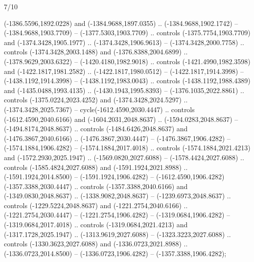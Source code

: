 \begin{flagdescription}{7/10}
\begin{scope}[xshift=0.5\flaglength,yshift=0.5\flagwidth,scale=\flagwidth/460.13]
\begin{scope}[y=-0.1mm, x=0.1mm,shift={(1416.8628,-2316.7455)}]
  (-1386.5596,1892.0228) and (-1384.9688,1897.0355) .. (-1384.9688,1902.1742) --
  (-1384.9688,1903.7709) -- (-1377.5303,1903.7709) .. controls
  (-1375.7754,1903.7709) and (-1374.3428,1905.1977) .. (-1374.3428,1906.9613) --
  (-1374.3428,2000.7758) .. controls (-1374.3428,2003.1488) and
  (-1376.8388,2004.6899) .. (-1378.9629,2003.6322) -- (-1420.4180,1982.9018) ..
  controls (-1421.4990,1982.3598) and (-1422.1817,1981.2582) ..
  (-1422.1817,1980.0512) -- (-1422.1817,1914.3998) -- (-1438.1192,1914.3998) --
  (-1438.1192,1983.0043) .. controls (-1438.1192,1988.4389) and
  (-1435.0488,1993.4135) .. (-1430.1943,1995.8393) -- (-1376.1035,2022.8861) ..
  controls (-1375.0224,2023.4252) and (-1374.3428,2024.5297) ..
  (-1374.3428,2025.7367) -- cycle(-1612.4590,2030.4447) .. controls
  (-1612.4590,2040.6166) and (-1604.2031,2048.8637) .. (-1594.0283,2048.8637) --
  (-1494.8174,2048.8637) .. controls (-1484.6426,2048.8637) and
  (-1476.3867,2040.6166) .. (-1476.3867,2030.4447) -- (-1476.3867,1906.4282) --
  (-1574.1884,1906.4282) -- (-1574.1884,2017.4018) .. controls
  (-1574.1884,2021.4213) and (-1572.2930,2025.1947) .. (-1569.0820,2027.6088) --
  (-1578.4424,2027.6088) .. controls (-1585.4824,2027.6088) and
  (-1591.1924,2021.8988) .. (-1591.1924,2014.8500) -- (-1591.1924,1906.4282) --
  (-1612.4590,1906.4282)(-1357.3388,2030.4447) .. controls
  (-1357.3388,2040.6166) and (-1349.0830,2048.8637) .. (-1338.9082,2048.8637) --
  (-1239.6973,2048.8637) .. controls (-1229.5224,2048.8637) and
  (-1221.2754,2040.6166) .. (-1221.2754,2030.4447) -- (-1221.2754,1906.4282) --
  (-1319.0684,1906.4282) -- (-1319.0684,2017.4018) .. controls
  (-1319.0684,2021.4213) and (-1317.1728,2025.1947) .. (-1313.9619,2027.6088) --
  (-1323.3223,2027.6088) .. controls (-1330.3623,2027.6088) and
  (-1336.0723,2021.8988) .. (-1336.0723,2014.8500) -- (-1336.0723,1906.4282) --
  (-1357.3388,1906.4282);
\end{scope}
\end{scope}
\framecode{}
\end{flagdescription}
